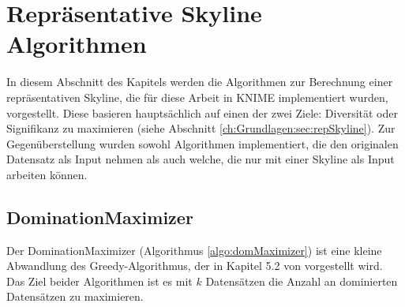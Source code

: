 \section{Repräsentative Skyline Algorithmen}
\label{ch:Analyse:sec:repSkyAlgos}
In diesem Abschnitt des Kapitels werden die Algorithmen zur Berechnung einer repräsentativen Skyline, die für diese Arbeit in KNIME implementiert wurden, vorgestellt. 
Diese basieren hauptsächlich auf einen der zwei Ziele: Diversität oder Signifikanz zu maximieren (siehe Abschnitt \ref{ch:Grundlagen:sec:repSkyline}).
Zur Gegenüberstellung wurden sowohl Algorithmen implementiert, die den originalen Datensatz als Input nehmen als auch welche, die nur mit einer Skyline als Input arbeiten können.
\subsection{DominationMaximizer}
\label{ch:Analyse:sec:repSkyAlgos:subsec:domMax}
Der DominationMaximizer (Algorithmus \ref{algo:domMaximizer}) ist eine kleine Abwandlung des Greedy-Algorithmus, der in Kapitel 5.2 von \cite{4221657} vorgestellt wird. 
Das Ziel beider Algorithmen ist es mit $k$ Datensätzen die Anzahl an dominierten Datensätzen zu maximieren. 

